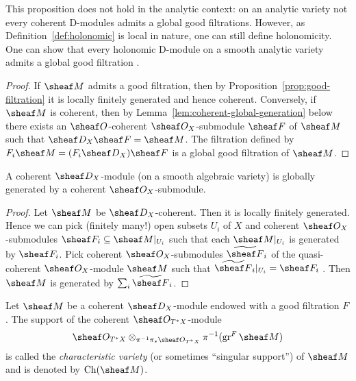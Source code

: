 \documentclass[number-in-sections,a4paper]{notes}
\begin{document}
\begin{Remark}
    This proposition does not hold in the analytic context: on an analytic variety not every coherent D-modules admits a global good filtrations.
    However, as Definition~\ref{def:holonomic} is local in nature, one can still define holonomicity.
    One can show that every holonomic D-module on a smooth analytic variety admits a global good filtration \cite[Theorem~.3.1]{Malgrange:2004:OnIrregularHolonomicDModules}.
\end{Remark}

\begin{proof}
    If $\sheaf M$ admits a good filtration, then by Proposition~\ref{prop:good-filtration} it is locally finitely generated and hence coherent.
    Conversely, if $\sheaf M$ is coherent, then by Lemma~\ref{lem:coherent-global-generation} below there exists an $\sO$-coherent $\sO_X$-submodule $\sheaf F$ of $\sheaf M$ such that $\sD_X\sheaf F = \sheaf M$.
    The filtration defined by $F_i\sheaf M = (F_i\sD_X)\sheaf F$ is a global good filtration of $\sheaf M$.
\end{proof}

\begin{Lemma}\label{lem:coherent-global-generation}
    A coherent $\sD_X$-module (on a smooth algebraic variety) is globally generated by a coherent $\sO_X$-submodule.
\end{Lemma}

\begin{proof}
    Let $\sheaf M$ be $\sD_X$-coherent.
    Then it is locally finitely generated.
    Hence we can pick (finitely many!) open subsets $U_i$ of $X$ and coherent $\sO_X$-submodules $\sheaf F_i \subseteq \res{\sheaf M}{U_i}$ such that each $\res{\sheaf M}{U_i}$ is generated by $\sheaf F_i$.
    Pick coherent $\sO_X$-submodules $\widetilde{\sheaf F}_i$ of the quasi-coherent $\sO_X$-module $\sheaf M$ such that $\res{\widetilde{\sheaf F}_i}{U_i} = \sheaf F_i$ \cite[Exercise~.5.15]{Hartshorne:AG}.
    Then $\sheaf M$ is generated by $\sum_i \widetilde{\sheaf F}_i$. 
\end{proof}

\begin{Definition}
    Let $\sheaf M$ be a coherent $\sD_X$-module endowed with a good filtration $F$.
    The support of the coherent $\sO_{T^*X}$-module
    \begin{equation}\label{eq:graded-on-cotangent}
        \sO_{T^*X} \otimes_{\pi^{-1}\pi_*\sO_{T^*X}} \pi^{-1}(\gr^F\sheaf M)
    \end{equation}
    is called the \emph{characteristic variety} (or sometimes \enquote{singular support}) of $\sheaf M$ and is denoted by $\Ch(\sheaf M)$.
\end{Definition}
\end{document}
